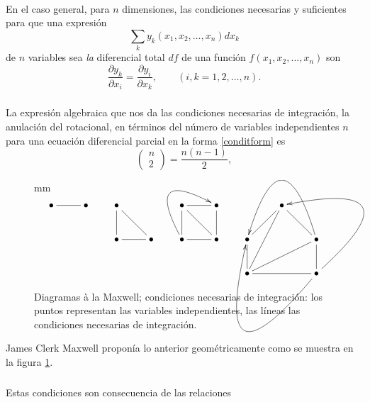 \documentclass{article}
\theoremstyle{definition} \newtheorem{defi}{Definici\'on}
\theoremstyle{definition} \newtheorem{teo}{Teorema}
\theoremstyle{definition} \newtheorem{cor}{Corolario}
\begin{document}
\paragraph{}
En el caso general, para $n$ dimensiones, las condiciones necesarias y suficientes para que una expresi\'on
$$\sum_ky_k(x_1,x_2,\dots,x_n)dx_k$$
de $n$ variables sea \emph{la} diferencial total $df$ de una funci\'on $f(x_1,x_2,\dots,x_n)$ son
\begin{equation}\label{conditform}
\frac{\partial y_k}{\partial x_i} = \frac{\partial y_i}{\partial x_k}, \qquad (i,k=1,2,\dots,n).
\end{equation}
\subparagraph{}
La expresi\'on algebraica que nos da las condiciones necesarias de integraci\'on, la anulaci\'on del rotacional, en t\'erminos del n\'umero de variables independientes $n$ para una ecuaci\'on diferencial parcial en la forma \eqref{conditform} es
\begin{equation}
\left(
\begin{matrix}
n\\
2
\end{matrix}
\right)
=
\frac{n\left(n-1\right)}{2},
\end{equation}
\begin{figure}[!t]
 mm
\begin{displaymath}
\xymatrix
{
\bullet \ar@{-}[r] & \bullet\\
}
\qquad
\xymatrix
{
\bullet \ar@{-}[d] \ar@{-}[dr]\\
\bullet \ar@{-}[r] & \bullet\\
}
\qquad
\xymatrix
{
\bullet \ar@{-}[r] \ar@{-}[d] & \bullet \ar@{-}[d]\\ 
\bullet \ar@{-}[r] \ar@/^3.5pc/[ur]& \bullet \ar@{-}[ul] \\
}
\qquad
\xymatrix
{
&\bullet&\\ 
\bullet \ar@{-}[ur] \ar@{-}[d] & & \bullet \ar@{-}[ul] \ar@{-}[d] \ar@/_5pc/[ll]\\ 
\bullet \ar@{-}[rr] \ar@{-}[uur] \ar@{-}[urr] & & \bullet \ar@/^7pc/[ull] \ar@/_6pc/[uul]\\
}
\end{displaymath}
\caption{Diagramas \`a la Maxwell; condiciones necesarias de integraci\'on: los puntos representan las variables independientes, las l\'ineas las condiciones necesarias de integraci\'on.}
\label{maxdia}
\end{figure}
James Clerk Maxwell propon\'ia lo anterior geom\'etricamente como se muestra en la figura \ref{maxdia}.
\subparagraph{}
Estas condiciones son consecuencia de las relaciones
\end{document}
